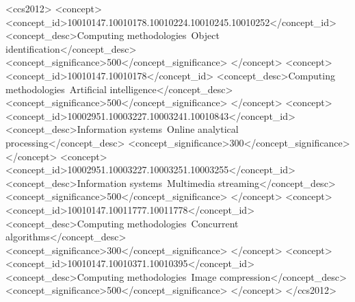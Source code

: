 \documentclass[manuscript, screen]{acmart}
\begin{document}
\begin{CCSXML}
<ccs2012>
   <concept>
       <concept_id>10010147.10010178.10010224.10010245.10010252</concept_id>
       <concept_desc>Computing methodologies~Object identification</concept_desc>
       <concept_significance>500</concept_significance>
       </concept>
   <concept>
       <concept_id>10010147.10010178</concept_id>
       <concept_desc>Computing methodologies~Artificial intelligence</concept_desc>
       <concept_significance>500</concept_significance>
       </concept>
   <concept>
       <concept_id>10002951.10003227.10003241.10010843</concept_id>
       <concept_desc>Information systems~Online analytical processing</concept_desc>
       <concept_significance>300</concept_significance>
       </concept>
   <concept>
       <concept_id>10002951.10003227.10003251.10003255</concept_id>
       <concept_desc>Information systems~Multimedia streaming</concept_desc>
       <concept_significance>500</concept_significance>
       </concept>
   <concept>
       <concept_id>10010147.10011777.10011778</concept_id>
       <concept_desc>Computing methodologies~Concurrent algorithms</concept_desc>
       <concept_significance>300</concept_significance>
       </concept>
   <concept>
       <concept_id>10010147.10010371.10010395</concept_id>
       <concept_desc>Computing methodologies~Image compression</concept_desc>
       <concept_significance>500</concept_significance>
       </concept>
 </ccs2012>
\end{CCSXML}



\maketitle
\end{document}

